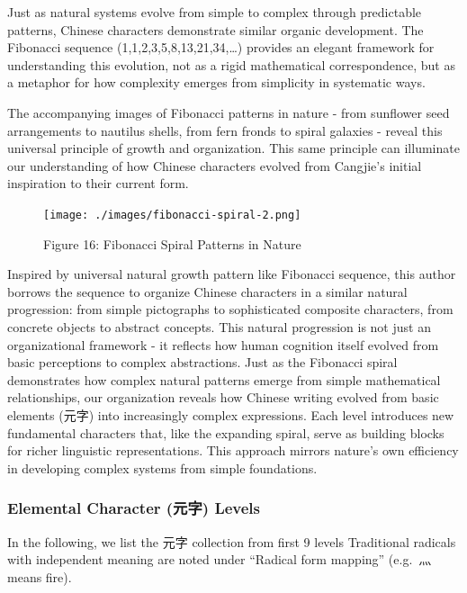 \documentclass[
  11pt,
  letterpaper,
]{article}
\begin{document}
Just as natural systems evolve from simple to complex through
predictable patterns, Chinese characters demonstrate similar organic
development. The Fibonacci sequence (1,1,2,3,5,8,13,21,34,\ldots)
provides an elegant framework for understanding this evolution, not as a
rigid mathematical correspondence, but as a metaphor for how complexity
emerges from simplicity in systematic ways.

The accompanying images of Fibonacci patterns in nature - from sunflower
seed arrangements to nautilus shells, from fern fronds to spiral
galaxies - reveal this universal principle of growth and organization.
This same principle can illuminate our understanding of how Chinese
characters evolved from Cangjie's initial inspiration to their current
form.

\begin{figure}
\centering
\texttt{[image: ./images/fibonacci-spiral-2.png]}
\caption{Figure 16: Fibonacci Spiral Patterns in Nature}
\end{figure}

Inspired by universal natural growth pattern like Fibonacci sequence,
this author borrows the sequence to organize Chinese characters in a
similar natural progression: from simple pictographs to sophisticated
composite characters, from concrete objects to abstract concepts. This
natural progression is not just an organizational framework - it
reflects how human cognition itself evolved from basic perceptions to
complex abstractions. Just as the Fibonacci spiral demonstrates how
complex natural patterns emerge from simple mathematical relationships,
our organization reveals how Chinese writing evolved from basic elements
(元字) into increasingly complex expressions. Each level introduces new
fundamental characters that, like the expanding spiral, serve as
building blocks for richer linguistic representations. This approach
mirrors nature's own efficiency in developing complex systems from
simple foundations.

\subsubsection{Elemental Character (元字)
Levels}\label{elemental-character-ux5143ux5b57-levels}

In the following, we list the 元字 collection from first 9 levels
Traditional radicals with independent meaning are noted under ``Radical
form mapping'' (e.g.~灬 means fire).
\end{document}
